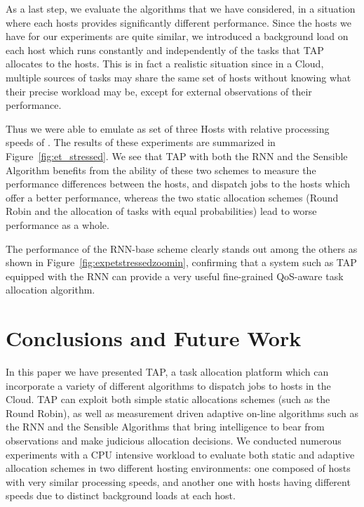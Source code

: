 \documentclass[journal]{IEEEtran}
\begin{document}
As a last step, we evaluate the algorithms that we have considered, in a situation where each hosts provides significantly different performance. Since the hosts we have for our experiments are quite similar, we 
introduced a background load on each host which runs constantly and independently of the tasks that TAP allocates to the hosts. This is in fact a realistic situation since in a Cloud,
multiple sources of tasks may share the same set of hosts without knowing what their precise workload may be, except for external observations of their performance.

Thus we were able to emulate as set of three Hosts  with relative processing speeds of . The results of these experiments are
 summarized in Figure~\ref{fig:et_stressed}. 
 We see that TAP with both the RNN and the Sensible Algorithm benefits from the ability of these two schemes to measure the performance differences between the hosts, and dispatch jobs to the hosts which offer a better  performance, whereas the two static allocation schemes (Round Robin and the allocation of tasks with equal probabilities) lead to worse performance as a whole. 
 
 The performance of the RNN-base scheme clearly stands out among the others as shown in Figure~\ref{fig:expetstressedzoomin}, confirming that a system such as TAP equipped with the RNN 
 can provide a very useful fine-grained QoS-aware task allocation algorithm.



\section{Conclusions and Future Work} \label{conclusions}

In this paper we have presented TAP, a task allocation platform which can incorporate a variety of different algorithms to dispatch jobs to hosts in the Cloud.
TAP can exploit both simple static allocations schemes (such as the Round Robin), as well as measurement driven adaptive on-line algorithms such as the 
RNN and the Sensible Algorithms that bring intelligence to bear from observations and make judicious allocation decisions. 
We conducted numerous experiments with a CPU intensive workload to evaluate both static and adaptive allocation schemes in two different hosting environments: one composed of hosts with very similar processing speeds, and another one with hosts having different speeds due to distinct background loads at each host. 
\end{document}
